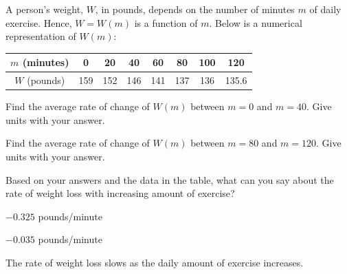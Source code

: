 \begin{exercise}
A person's weight, $W$, in pounds, depends on the number of minutes $m$ of daily exercise. Hence, $W=W(m)$ is a function of $m$. Below is a numerical representation of $W(m)$:
\begin{center}
\begin{tabular}{|c|c|c|c|c|c|c|c|}
\hline $m$ (minutes) & 0 & 20 & 40 & 60 & 80 & 100 & 120
\\\hline $W$ (pounds) & 159 & 152 & 146 & 141 & 137 & 136 & 135.6 
\\\hline
\end{tabular}
\end{center}

    \begin{parts}
        \item Find the average rate of change of $W(m)$ between $m=0$ and $m=40$. Give units with your answer.

        \item Find the average rate of change of $W(m)$ between $m=80$ and $m=120$. Give units with your answer.

        \item Based on your answers and the data in the table, what can you say about the rate of weight loss with increasing amount of exercise?
    \end{parts}


\end{exercise}


\begin{solution}
    \begin{parts}
        \item $-0.325$ pounds/minute
        \item $-0.035$ pounds/minute
        \item The rate of weight loss slows as the daily amount of exercise increases.
    \end{parts}
\end{solution}







